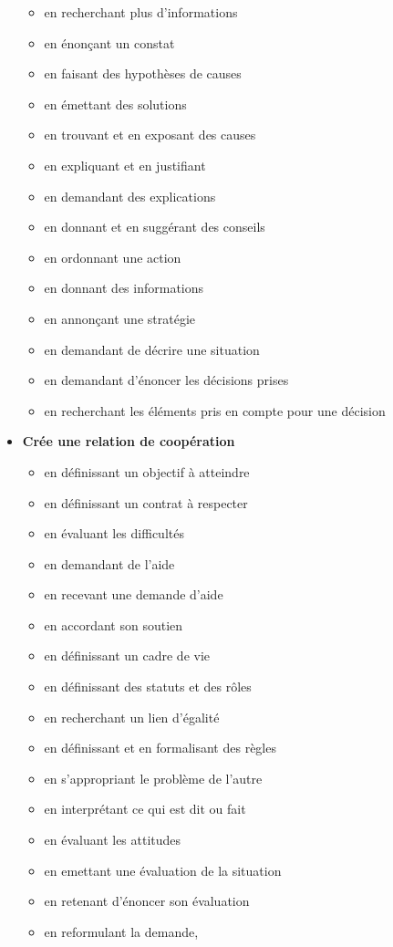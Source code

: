 \documentclass[8pt,a4paper]{article}
\begin{document}
\begin{itemize}
\begin{itemize}
\item en recherchant plus d'informations  
\item en énonçant un constat
\item en faisant des hypothèses de causes
\item en émettant des solutions
\item en trouvant et en exposant des causes  
\item en expliquant et en justifiant
\item en demandant des explications
\item en donnant et en suggérant des conseils  
\item en ordonnant une action
\item en donnant des informations
\item en annonçant une stratégie  
\item en demandant de décrire une situation  
\item en demandant d'énoncer les décisions prises  
\item en recherchant les éléments pris en compte pour une décision
\\ 
 \end{itemize}
\item \textbf{Crée une relation de coopération}
\begin{itemize}
\item en définissant un objectif à atteindre
\item en définissant un contrat à respecter
\item en évaluant les difficultés
\item en demandant de l'aide
\item en recevant une demande d'aide
\item en accordant son soutien
\item en définissant un cadre de vie
\item en définissant des statuts et des rôles
\item en recherchant un lien d'égalité
\item en définissant et en formalisant des règles
\item en s'appropriant le problème de l'autre
\item en interprétant ce qui est dit ou fait
\item en évaluant les attitudes  
\item en emettant une évaluation de la situation  
\item en retenant d'énoncer son évaluation  
\item en reformulant la demande,  

\end{itemize}
\end{itemize}
\end{document}
